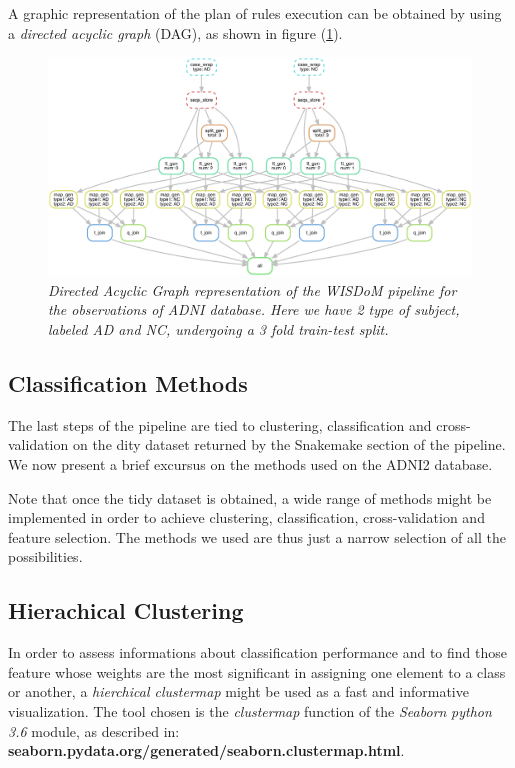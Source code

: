 \documentclass[12pt,openright,twoside,a4paper]{book}
\begin{document}
A graphic representation of the plan of rules execution can be obtained by using a \textit{directed acyclic graph} (DAG), as shown in figure (\ref{dag}).

\clearpage

\begin{figure}[!h]
\centering
\includegraphics[scale=0.53, angle=270]{dag}
\caption{\textit{Directed Acyclic Graph representation of the WISDoM pipeline for the observations of ADNI database. Here we have 2 type of subject, labeled AD and NC, undergoing a 3 fold train-test split.}}
\label{dag}
\end{figure}

\subsection{Classification Methods}

The last steps of the pipeline are tied to clustering, classification and cross-validation on the dity dataset returned by the Snakemake section of the pipeline.
We now present a brief excursus on the methods used on the ADNI2 database.

Note that once the tidy dataset is obtained, a wide range of methods might be implemented in order to achieve clustering, classification, cross-validation and feature selection.
The methods we used are thus just a narrow selection of all the possibilities.

\subsection*{Hierachical Clustering}

In order to assess informations about classification performance and to find those feature whose weights are the most significant in assigning one element to a class or another, a \textit{hierchical clustermap} might be used as a fast and informative visualization.
The tool chosen is the \textit{clustermap} function of the \textit{Seaborn} \textit{python 3.6} module, as described in:\\ \textbf{seaborn.pydata.org/generated/seaborn.clustermap.html}.
\end{document}
